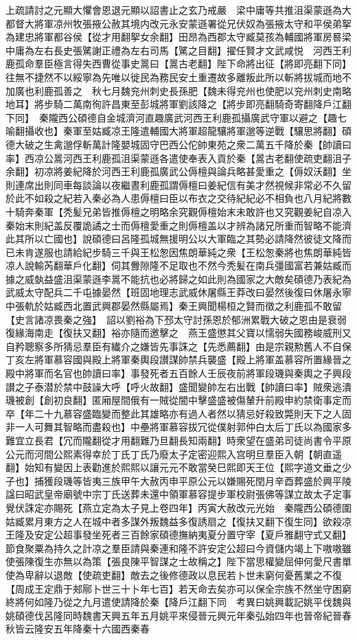 上疏請討之元顯大懼會恩退元顯以詔書止之玄乃戒嚴　梁中庸等共推沮渠蒙遜為大都督大將軍凉州牧張掖公赦其境内改元永安蒙遜署從兄伏奴為張掖太守和平侯弟挐為建忠將軍都谷侯【從才用翻挐女余翻】田昂為西郡太守臧莫孩為輔國將軍房晷梁中庸為左右長史張騭謝正禮為左右司馬【騭之目翻】擢任賢才文武咸悦　河西王利鹿孤命羣臣極言得失西曹從事史暠曰【暠古老翻】陛下命將出征【將即亮翻下同】往無不捷然不以綏寧為先唯以徙民為務民安土重遷故多離叛此所以斬將拔城而地不加廣也利鹿孤善之　秋七月魏兖州刺史長孫肥【魏未得兖州也使肥以兖州刺史南略地耳】將步騎二萬南徇許昌東至彭城將軍劉該降之【將步即亮翻騎奇寄翻降戶江翻下同】　秦隴西公碩德自金城濟河直趣廣武河西王利鹿孤攝廣武守軍以避之【趣七喻翻攝收也】秦軍至姑臧凉王隆遣輔國大將軍超龍驤將軍邈等逆戰【驤思將翻】碩德大破之生禽邈俘斬萬計隆嬰城固守巴西公佗帥東苑之衆二萬五千降於秦【帥讀曰率】西凉公暠河西王利鹿孤沮渠蒙遜各遣使奉表入貢於秦【暠古老翻使疏吏翻沮子余翻】初凉將姜紀降於河西王利鹿孤廣武公傉檀與論兵略甚愛重之【傉奴沃翻】坐則連席出則同車每談論以夜繼晝利鹿孤謂傉檀曰姜紀信有美才然視候非常必不久留於此不如殺之紀若入秦必為人患傉檀曰臣以布衣之交待紀紀必不相負也八月紀將數十騎奔秦軍【秃髪兄弟皆推傉檀之明略余究觀傉檀始末未敢許也又究觀姜紀自凉入秦始末則紀盖反覆詭譎之士而傉檀愛重之則傉檀盖以才辨為諸兄所重而智略不能濟此其所以亡國也】說碩德曰呂隆孤城無援明公以大軍臨之其勢必請降然彼徒文降而已未肯遂服也請給紀步騎三千與王松怱因焦朗華純之衆【王松怱秦將也焦朗華純皆凉人說輸芮翻華戶化翻】伺其釁隙隆不足取也不然今秃髪在南兵彊國富若兼姑臧而據之威埶益盛沮渠蒙遜李暠不能抗也必將歸之如此則為國家之大敵矣碩德乃表紀為武威太守配兵二千屯據晏然【班固地理志武威休屠縣王莽改曰晏然後復曰休屠永寧中張軌於姑臧西北置武興郡晏然縣屬焉】秦王興聞楊桓之賢而徵之利鹿孤不敢留【史言諸凉畏秦之強】　詔以劉裕為下邳太守討孫恩於郁洲累戰大破之恩由是衰弱復緣海南走【復扶又翻】裕亦隨而邀擊之　燕王盛懲其父寶以懦弱失國務峻威刑又自矜聰察多所猜忌羣臣有纎介之嫌皆先事誅之【先悉薦翻】由是宗親勲舊人不自保丁亥左將軍慕容國與殿上將軍秦輿段讃謀帥禁兵襲盛【殿上將軍盖慕容所置緣晉之殿中將軍而名官也帥讀曰率】事發死者五百餘人壬辰夜前將軍段璣與秦輿之子興段讃之子泰潜於禁中鼓譟大呼【呼火故翻】盛聞變帥左右出戰【帥讀曰率】賊衆逃潰璣被創【創初良翻】匿廂屋間俄有一賊從闇中擊盛盛被傷輦升前殿申約禁衛事定而卒【年二十九慕容盛臨變而整此其雄略亦有過人者然以猜忌好殺致斃則天下之人固非一人可舞其智略而盡殺也】中壘將軍慕容拔冗從僕射郭仲白太后丁氏以為國家多難宜立長君【冗而隴翻從才用翻難乃旦翻長知兩翻】時衆望在盛弟司徒尚書令平原公元而河間公熙素得幸於丁氏丁氏乃廢太子定密迎熙入宫明旦羣臣入朝【朝直遥翻】始知有變因上表勸進於熙熙以讓元元不敢當癸巳熙即天王位【熙字道文垂之少子也】捕獲段璣等皆夷三族甲午大赦丙申平原公元以嫌賜死閏月辛酉葬盛於興平陵諡曰昭武皇帝廟號中宗丁氏送葬未還中領軍慕容提步軍校尉張佛等謀立故太子定事覺伏誅定亦賜死【燕立定為太子見上卷四年】丙寅大赦改元光始　秦隴西公碩德圍姑臧累月東方之人在城中者多謀外叛魏益多復誘扇之【復扶又翻下復生同】欲殺凉王隆及安定公超事發坐死者三百餘家碩德撫納夷夏分置守宰【夏戶雅翻守式又翻】節食聚粟為持久之計凉之羣臣請與秦連和隆不許安定公超曰今資儲内竭上下嗷嗷雖使張陳復生亦無以為策【張良陳平智謀之士故稱之】陛下當思權變屈伸何愛尺書單使為卑辭以退敵【使疏吏翻】敵去之後修德政以息民若卜世未窮何憂舊業之不復【周成王定鼎于郟鄏卜世三十卜年七百】若天命去矣亦可以保全宗族不然坐守困窮終將何如隆乃從之九月遣使請降於秦【降戶江翻下同　考異曰姚興載記姚平伐魏與姚碩德伐呂隆同時魏書天興五年五月姚平來侵晉元興元年秦弘始四年也晉帝紀晉春秋皆云隆安五年降秦十六國西秦春